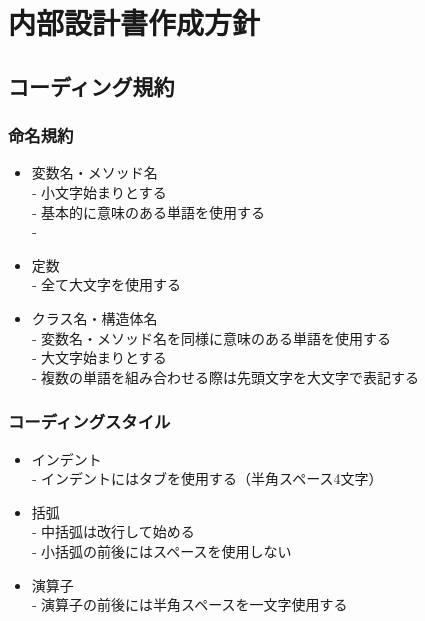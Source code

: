 \documentclass[a4j]{jarticle}
\begin{document}
 \section{内部設計書作成方針}
\subsection{コーディング規約}
\subsubsection{命名規約}
\begin{itemize}
\item 変数名・メソッド名\\
‐ 小文字始まりとする\\
‐ 基本的に意味のある単語を使用する\\
‐
\end{itemize}
\begin{itemize}
\item 定数\\
‐ 全て大文字を使用する\\
\end{itemize}
\begin{itemize}
\item クラス名・構造体名\\
‐ 変数名・メソッド名を同様に意味のある単語を使用する\\
‐ 大文字始まりとする\\
‐ 複数の単語を組み合わせる際は先頭文字を大文字で表記する\\
\end{itemize}
\subsubsection{コーディングスタイル}
\begin{itemize}
\item インデント\\
‐ インデントにはタブを使用する（半角スペース4文字）
\end{itemize}
\begin{itemize}
\item 括弧\\
‐ 中括弧は改行して始める\\
‐ 小括弧の前後にはスペースを使用しない
\end{itemize}
\begin{itemize}
\item 演算子\\
‐ 演算子の前後には半角スペースを一文字使用する
\end{itemize}
\end{document}
